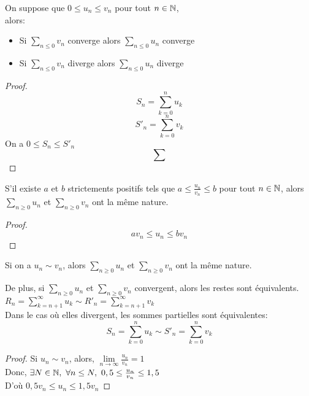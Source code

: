 \documentclass[../main.tex]{subfile}
\begin{document}
\begin{theo}
	On suppose que $0 \leq u_n \leq v_n$ pour tout $n \in \mathbb{N}$, \\
	alors:
\begin{itemize}	
	\item Si $\sum_{n \leq 0}v_n$ converge alors $\sum\limits_{n \leq 0} u_n$ converge
	\item Si $\sum_{n \leq 0}v_n$ diverge alors $\sum\limits_{n \leq 0} u_n$ diverge
\end{itemize}
\end{theo}

\begin{proof}
	$$S_n = \sum\limits_{k=0}^n u_k$$
	$$S'_n = \sum\limits_{k=0}^n v_k$$
	On a $0 \leq S_n \leq S'_n$\\
	$$\sum$$
\end{proof}

\begin{corrol}
	S'il existe $a$ et $b$ strictements positifs tels que $a \leq \frac{u_n}{v_n} \leq b$ pour tout $n \in \mathbb{N}$, 
	alors $\sum\limits_{n \geq 0} u_n$ et $\sum\limits_{n \geq 0} v_n$ ont la même nature.
\end{corrol}

\begin{proof}
	$$av_n \leq u_n \leq bv_n$$
\end{proof}

\begin{corrol}
	Si on a $u_n \sim v_n$, alors $\sum\limits_{n \geq 0} u_n$ et $\sum\limits_{n \geq 0} v_n$ ont la même nature.

	De plus, si $\sum\limits_{n \geq 0} u_n$ et $\sum\limits_{n \geq 0} v_n$ convergent, alors les restes sont équivalents.\\
	$R_n = \sum\limits_{k = n + 1}^\infty u_k \sim R'_n = \sum\limits_{k = n+1}^\infty v_k$\\
	Dans le cas où elles divergent, les sommes partielles sont équivalentes:
	$$S_n = \sum\limits_{k=0}^n u_k \sim S'_n = \sum\limits_{k=0}^n v_k$$
\end{corrol}

\begin{proof}
	Si $u_n \sim v_n$, alors, $\lim\limits_{n \to \infty} \frac{u_n}{v_n} = 1$\\
	Donc, $\exists N \in \mathbb{N}, \ \forall n \leq N, \ 0,5 \leq \frac{u_n}{v_n} \leq 1,5$\\
	D'où $0,5 v_n \leq u_n \leq 1,5 v_n$
\end{proof}
\end{document}
